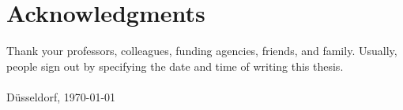 \titleformat{\chapter}[hang]{\huge\bfseries}{\thechapter}{1em}{}
\titlespacing{\chapter}{0pt}{0pt}{1cm}

\chapter{Acknowledgments}

Thank your professors, colleagues, funding agencies, friends, and family. Usually,
people sign out by specifying the date and time of writing this thesis.
\\\\
D\"usseldorf, \today
